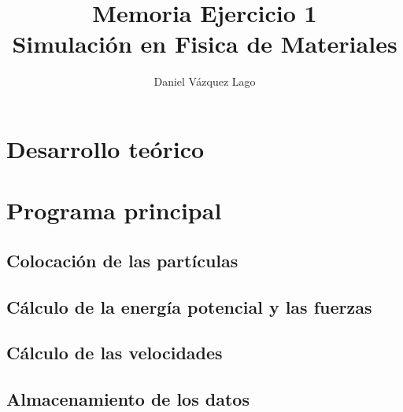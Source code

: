 \documentclass[12pt]{article}
\title{Memoria Ejercicio 1 \\ Simulación en Fisica de Materiales} %
\author{Daniel Vázquez Lago} %
\begin{document}
\maketitle

\newpage

\tableofcontents


\newpage

\section{Desarrollo teórico}

\section{Programa principal}

\subsection{Colocación de las partículas}

\subsection{Cálculo de la energía potencial y las fuerzas}

\subsection{Cálculo de las velocidades}

\subsection{Almacenamiento de los datos}
\end{document}
